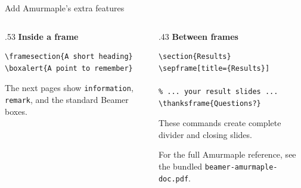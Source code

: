 \begin{frame}[fragile]{Add Amurmaple's extra features}
  \begin{columns}[T,onlytextwidth]
    \begin{column}{.53\textwidth}
      \textbf{Inside a frame}
      {\small
\begin{verbatim}
\framesection{A short heading}
\boxalert{A point to remember}
\end{verbatim}
      }
      \bigskip

      The next pages show \texttt{information}, \texttt{remark}, and
      the standard Beamer boxes.
    \end{column}
    \begin{column}{.43\textwidth}
      \textbf{Between frames}
      {\small
\begin{verbatim}
\section{Results}
\sepframe[title={Results}]

% ... your result slides ...
\thanksframe{Questions?}
\end{verbatim}
      }
      These commands create complete divider and closing slides.
      \medskip

      For the full Amurmaple reference, see the bundled
      \texttt{beamer-amurmaple-doc.pdf}.
    \end{column}
  \end{columns}
\end{frame}
